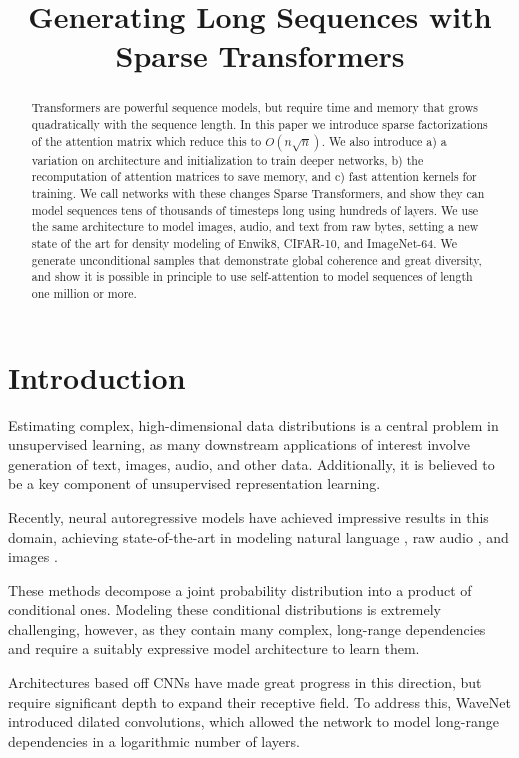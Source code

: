 \title{Generating Long Sequences with Sparse Transformers}

\begin{abstract}
Transformers are powerful sequence models, but require time and memory that grows quadratically with the sequence length. In this paper we introduce sparse factorizations of the attention matrix which reduce this to $O(n \sqrt{n})$. We also introduce a) a variation on architecture and initialization to train deeper networks, b) the recomputation of attention matrices to save memory, and c) fast attention kernels for training. We call networks with these changes Sparse Transformers, and show they can model sequences tens of thousands of timesteps long using hundreds of layers. We use the same architecture to model images, audio, and text from raw bytes, setting a new state of the art for density modeling of Enwik8, CIFAR-10, and ImageNet-64. We generate unconditional samples that demonstrate global coherence and great diversity, and show it is possible in principle to use self-attention to model sequences of length one million or more.
\end{abstract}

\section{Introduction}
\label{introduction}

Estimating complex, high-dimensional data distributions is a central problem in unsupervised learning, as many downstream applications of interest involve generation of text, images, audio, and other data. Additionally, it is believed to be a key component of unsupervised representation learning.

Recently, neural autoregressive models have achieved impressive results in this domain, achieving state-of-the-art in modeling natural language \cite{jozefowicz2016exploring} \cite{radford2018} \cite{dai2018transformer}, raw audio \cite{van2016wavenet} \cite{mehri2016samplernn}, and images \cite{oord2016pixel} \cite{menick2018generating} \cite{salimans2017pixelcnn++} \cite{reed2017parallel} \cite{chen2017pixelsnail}.

These methods decompose a joint probability distribution into a product of conditional ones. Modeling these conditional distributions is extremely challenging, however, as they contain many complex, long-range dependencies and require a suitably expressive model architecture to learn them.

Architectures based off CNNs \cite{oord2016pixel} have made great progress in this direction, but require significant depth to expand their receptive field. To address this, WaveNet \cite{van2016wavenet} introduced dilated convolutions, which allowed the network to model long-range dependencies in a logarithmic number of layers.

